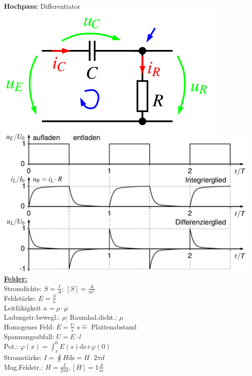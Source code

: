 \documentclass[8pt]{extarticle}
\begin{document}
\begin{minipage}{0.33\textwidth}
\textbf{Hochpass:} Differentiator\\
\includegraphics[scale=0.3]{hochpass.png}\\
\includegraphics[scale=0.1]{hochpassuit.png}\\
\underline{\textbf{Felder:}}\\
Stromdichte: $S=\frac{I}{A}$; $[S] = \frac{A}{m^2}$\\
Feldstärke: $E=\frac{S}{\kappa}$\\
Leitfähigkeit $\kappa = \rho \cdot \mu$\\
Ladungstr.bewegl.: $\rho$; Raumlad.dicht.: $\mu$\\
Homogenes Feld: $E=\frac{U}{s}$ {\tiny$s\hat{=}$ Plattenabstand}\\
Spannungsabfall: $U=E \cdot l$\\
Pot.: $\varphi (x)= \int_x^0 E(s)$ds$ + \varphi(0)$\\
Stromstärke: $I = \oint H $ds$ = H \cdot 2\pi d$\\
Mag.Feldstr.: $H = \frac{I}{2\pi d}, [H] = 1\frac{A}{m}$\\

\end{minipage}
\end{document}
